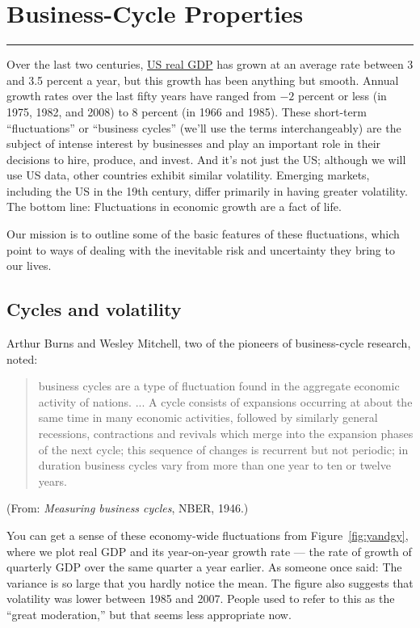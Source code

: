 \chapter{Business-Cycle Properties}\label{chp:bcpr}
\hypertarget{cycles}{}


\rule{\textwidth}{1pt}

Over the last two centuries,
\href{http://research.stlouisfed.org/fred2/series/GDPC1?cid=106}{US real GDP}
has grown at an average
rate between 3 and 3.5 percent a year,
but this growth has been anything but smooth.
Annual growth rates over the last fifty years have
ranged from $-2$ percent or less (in 1975, 1982, and 2008)
to 8 percent (in 1966 and 1985).
These short-term ``fluctuations'' or ``business cycles''
(we'll use the terms interchangeably)
are the subject of intense interest by businesses
and play an important role in their decisions to hire, produce, and invest.
And it's not just the US;
although we will use US data, other countries exhibit similar
volatility.
Emerging markets, including the US in the 19th century,
differ primarily in having greater volatility.
The bottom line:  Fluctuations in economic growth
are a fact of life.

Our mission is to outline some of the basic features
of these fluctuations, which point to ways of dealing with
the inevitable risk and uncertainty they bring to our lives.


\section{Cycles and volatility }

Arthur Burns and Wesley Mitchell,
two of the pioneers of business-cycle research, noted:
%
\begin{quote}
{business cycles 
 are a type of
fluctuation found in the aggregate economic activity of
nations. ... A cycle consists of expansions occurring at about the
same time in many economic activities, followed by similarly
general recessions, contractions and revivals which merge into the
expansion phases of the next cycle; this sequence of changes is
recurrent but not periodic; in duration business cycles
 vary from
more than one year to ten or twelve years.}
\end{quote}
(From: {\it Measuring business cycles\/}, NBER, 1946.)

You can get a sense of these economy-wide fluctuations
from Figure~\ref{fig:yandgy},
where we plot real GDP and its year-on-year growth rate --- the rate of growth of quarterly GDP over the same quarter a year earlier.
As someone once said:  The variance is so large that you hardly notice the mean.
The figure also suggests that volatility was lower between 1985
and 2007.
People used to refer to this as the ``great moderation,''
 but that seems less appropriate now.

